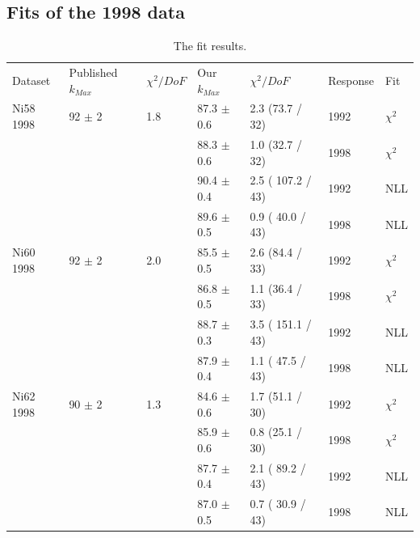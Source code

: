 \subsection { Fits of the 1998 data }
\begin{table}[h]
  \begin{center}
    \begin{tabular}{|l||l|l|l|l|l|l|}
      \hline
      Dataset & Published $k_{Max}$ & $\chi^2 / DoF$ & Our $k_{Max}$ & $\chi^2 / DoF$  & Response & Fit \\
      \hhline{|=||=|=|=|=|=|=|}
       Ni58 1998 & 92   $\pm$ 2   & 1.8 & 87.3 $\pm$ 0.6 &  2.3 (73.7 / 32) & 1992 & $\chi^2$ \\  
                 &                &     & 88.3 $\pm$ 0.6 &  1.0 (32.7 / 32) & 1998 & $\chi^2$ \\  
                                                                             
                &                 &     & 90.4 $\pm$ 0.4 & 2.5 ( 107.2 / 43) & 1992 & NLL \\
                &                 &     & 89.6 $\pm$ 0.5 & 0.9 ( 40.0 / 43) & 1998 & NLL \\
      \hline                                                                 
       Ni60 1998 & 92   $\pm$ 2   & 2.0 & 85.5 $\pm$ 0.5 &  2.6 (84.4 / 33) & 1992 & $\chi^2$ \\  
                 &                &     & 86.8 $\pm$ 0.5 &  1.1 (36.4 / 33) & 1998 & $\chi^2$ \\  
                                                                             
                &                 &     & 88.7 $\pm$ 0.3 & 3.5 ( 151.1 / 43) & 1992 & NLL \\
                &                 &     & 87.9 $\pm$ 0.4 & 1.1 ( 47.5 / 43) & 1998 & NLL \\
      \hline                                                                 
       Ni62 1998 & 90   $\pm$ 2   & 1.3 & 84.6 $\pm$ 0.6 &  1.7 (51.1 / 30) & 1992 & $\chi^2$ \\  
                 &                &     & 85.9 $\pm$ 0.6 &  0.8 (25.1 / 30) & 1998 & $\chi^2$ \\  
                                                                             
                &                 &     & 87.7 $\pm$ 0.4 & 2.1 ( 89.2 / 43) & 1992 & NLL \\
                &                 &     & 87.0 $\pm$ 0.5 & 0.7 ( 30.9 / 43) & 1998 & NLL \\
      \hline                           
    \end{tabular}
  \end{center}
  \caption{The fit results.}
  \label{table:fits1998}
\end{table}

